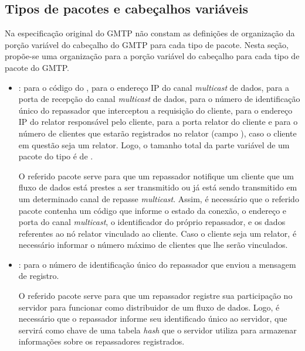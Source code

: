 \subsection{Tipos de pacotes e cabeçalhos variáveis}
\label{sec:impl_tipos}

Na especificação original do GMTP não constam as definições de organização da porção variável do cabeçalho do GMTP para cada tipo de pacote.
Nesta seção, propõe-se uma organização para a porção variável do cabeçalho para cada tipo de pacote do GMTP.

\begin{itemize}		
	\item {}:  para o código do ,  para o endereço IP do canal \textit{multicast} de dados,  para a porta de recepção do canal \textit{multicast} de dados,  para o número de identificação único do repassador que interceptou a requisição do cliente,  para o endereço IP do relator responsável pelo cliente,  para a porta relator do cliente e  para o número de clientes que estarão registrados no relator (campo ), caso o cliente em questão seja um relator. Logo, o tamanho total da parte variável de um pacote do tipo  é de .
	
	O referido pacote serve para que um repassador notifique um cliente que um fluxo de dados está prestes a ser transmitido ou já está sendo transmitido em um determinado canal de repasse \textit{multicast}.
	Assim, é necessário que o referido pacote contenha um código que informe o estado da conexão, o endereço e porta do canal \textit{multicast}, o identificador do próprio repassador, e os dados referentes ao nó relator vinculado ao cliente. Caso o cliente seja um relator, é necessário informar o número máximo de clientes que lhe serão vinculados.
	
	\item {}:  para o número de identificação único do repassador que enviou a mensagem de registro. 
	
	O referido pacote serve para que um repassador registre sua participação no servidor para funcionar como distribuidor de um fluxo de dados. Logo, é necessário que o repassador informe seu identificado único ao servidor, que servirá como chave de uma tabela \textit{hash} que o servidor utiliza para armazenar informações sobre os repassadores registrados.
	

\end{itemize}
